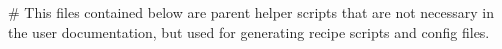 # This files contained below are parent helper scripts that are not necessary in the user documentation, but used for generating recipe scripts and config files.
